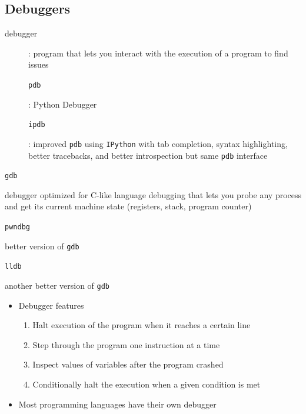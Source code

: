 \documentclass[letterpaper,12pt]{article}
\newcommand*{\lstitem}[1]{
  \setbox0\hbox{\lstinline{#1}}
  \item[\usebox0]
}
\begin{document}
\subsection{Debuggers}
\begin{description}
 \item[debugger]: program that lets you interact with the execution of a program to find issues
       \lstitem{pdb}: Python Debugger
       \lstitem{ipdb}: improved \lstinline{pdb} using \lstinline{IPython} with tab completion, syntax highlighting, better tracebacks, and better introspection but same \lstinline{pdb} interface
\end{description}

\begin{description}
 \lstitem{gdb} debugger optimized for C-like language debugging that lets you probe any process and get its current machine state (registers, stack, program counter)
 \lstitem{pwndbg} better version of \lstinline{gdb}
 \lstitem{lldb} another better version of \lstinline{gdb}
\end{description}


\begin{itemize}
 \item Debugger features
       \begin{enumerate}
        \item Halt execution of the program when it reaches a certain line
        \item Step through the program one instruction at a time
        \item Inspect values of variables after the program crashed
        \item Conditionally halt the execution when a given condition is met
       \end{enumerate}
 \item Most programming languages have their own debugger
\end{itemize}
\end{document}
